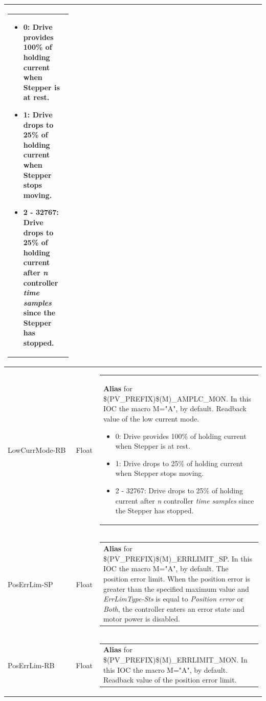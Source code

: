 \documentclass[openany]{article}
\begin{document}
\begin{longtable}{| m{4.5cm} m{2.5cm}  m{8.5cm} |}
\begin{tabular}{@{}m{6cm}@{}}
                \begin{itemize}
                    \item 0: Drive provides 100\% of holding current when Stepper is at rest.
                    \item 1: Drive drops to 25\% of holding current when Stepper stops moving.
                    \item 2 - 32767: Drive drops to 25\% of holding current after \emph{n} controller \emph{time samples} since the Stepper has stopped.
                \end{itemize}
            \end{tabular} \hypertarget{}{}\\ \hline
        LowCurrMode-RB & Float & \begin{tabular}{@{}m{6cm}@{}}
                \textbf{\color{blue} Alias} for \$(PV\_PREFIX)\$(M)\_AMPLC\_MON. In this IOC the macro M="A", by default. Readback value of the low current mode.
                \begin{itemize}
                    \item 0: Drive provides 100\% of holding current when Stepper is at rest.
                    \item 1: Drive drops to 25\% of holding current when Stepper stops moving.
                    \item 2 - 32767: Drive drops to 25\% of holding current after \emph{n} controller \emph{time samples} since the Stepper has stopped.
                \end{itemize}
            \end{tabular} \hypertarget{pv:pos-err-lim}{}\\ \hline
        PosErrLim-SP & Float & \begin{tabular}{@{}m{6cm}@{}}
                \textbf{\color{blue} Alias} for \$(PV\_PREFIX)\$(M)\_ERRLIMIT\_SP. In this IOC the macro M="A", by default. The position error limit. When the position error is greater than the specified maximum value and \emph{ErrLimType-Sts} is equal to \emph{Position error} or \emph{Both}, the controller enters an error state and motor power is disabled.
            \end{tabular} \hypertarget{}{}\\ \hline
        PosErrLim-RB & Float & \begin{tabular}{@{}m{6cm}@{}}
                \textbf{\color{blue} Alias} for \$(PV\_PREFIX)\$(M)\_ERRLIMIT\_MON. In this IOC the macro M="A", by default. Readback value of the position error limit.

\end{tabular}
\end{longtable}
\end{document}
